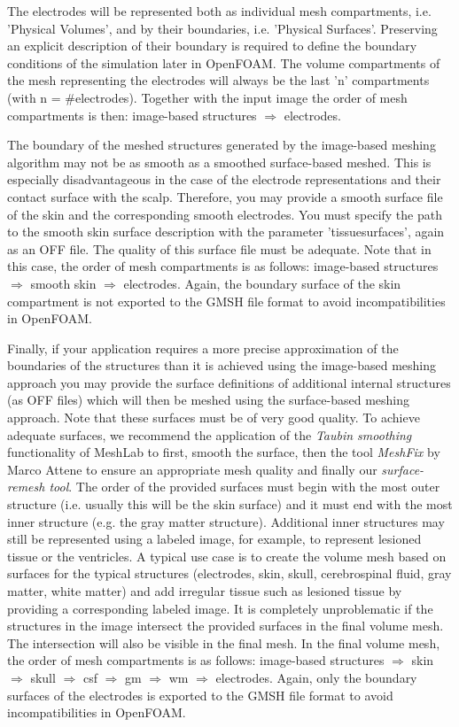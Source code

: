 The electrodes will be represented both as individual mesh compartments, i.e. 'Physical Volumes', and by
their boundaries, i.e. 'Physical Surfaces'. Preserving an explicit description of their boundary is required
to define the boundary conditions of the simulation later in OpenFOAM. The volume compartments of the mesh
representing the electrodes will always be the last 'n' compartments (with n = \#electrodes). Together with
the input image the order of mesh compartments is then: image-based structures $\Rightarrow$ electrodes.\par
The boundary of the meshed structures generated by the image-based meshing algorithm may not be as smooth as
a smoothed surface-based meshed. This is especially disadvantageous in the case of the electrode representations
and their contact surface with the scalp. Therefore, you may provide a smooth surface file of the skin and the
corresponding smooth electrodes. You must specify the path to the smooth skin surface description with the parameter
'tissuesurfaces', again as an OFF file. The quality of this surface file must be adequate. Note that in
this case, the order of mesh compartments is as follows: image-based structures $\Rightarrow$ smooth
skin $\Rightarrow$ electrodes. Again, the boundary surface of the skin compartment is not exported to the
GMSH file format to avoid incompatibilities in OpenFOAM.\par
Finally, if your application requires a more precise approximation of the boundaries of the structures than
it is achieved using the image-based meshing approach you may provide the surface definitions of additional
internal structures (as OFF files) which will then be meshed using the surface-based meshing approach. Note
that these surfaces must be of very good quality. To achieve adequate surfaces, we recommend the application
of the \emph{Taubin smoothing} functionality of MeshLab to first, smooth the surface, then the tool \emph{MeshFix}
by Marco Attene \cite{attene2010lightweight} to ensure an appropriate mesh quality and finally our
\emph{surface-remesh tool}. The order of the provided surfaces
must begin with the most outer structure (i.e. usually this will be the skin surface) and it must end with
the most inner structure (e.g. the gray matter structure). Additional inner structures may still be represented
using a labeled image, for example, to represent lesioned tissue or the ventricles. A typical use case is to
create the volume mesh based on surfaces for the typical structures (electrodes, skin, skull, cerebrospinal
fluid, gray matter, white matter) and add irregular tissue such as lesioned tissue by providing a corresponding
labeled image. It is completely unproblematic if the structures in the image intersect the provided surfaces
in the final volume mesh. The intersection will also be visible in the final mesh. In the final volume mesh,
the order of mesh compartments is as follows: image-based structures $\Rightarrow$ skin $\Rightarrow$ skull
$\Rightarrow$ csf $\Rightarrow$ gm $\Rightarrow$ wm $\Rightarrow$ electrodes. Again, only the boundary surfaces
of the electrodes is exported to the GMSH file format to avoid incompatibilities in OpenFOAM.\par

